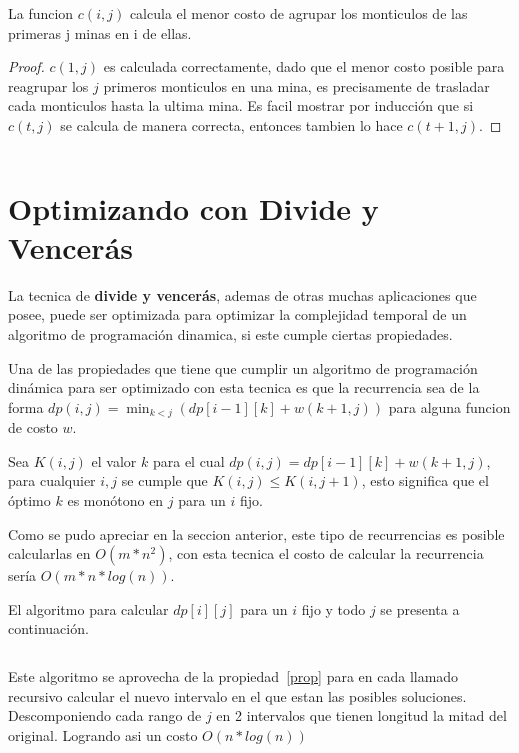 \documentclass[spanish]{llncs}
\begin{document}
\begin{theorem}
	La funcion $c(i,j)$ calcula el menor costo de agrupar los monticulos de
	las primeras j minas en i de ellas.
\end{theorem}

\begin{proof}
	$c(1,j)$ es calculada correctamente, dado que el menor costo posible para
	reagrupar los $j$ primeros monticulos en una mina, es precisamente de trasladar
	cada monticulos hasta la ultima mina. Es facil mostrar por inducción que si
	$c(t,j)$ se calcula de manera correcta, entonces tambien lo hace $c(t+1,j)$.
\end{proof}

\inputminted{python}{basic.py}

\section{Optimizando con Divide y Vencerás}

La tecnica de \textbf{divide y vencerás}, ademas de otras muchas aplicaciones
que posee, puede ser optimizada para optimizar la complejidad temporal de un
algoritmo de programación dinamica, si este cumple ciertas propiedades.

Una de las propiedades que tiene que cumplir un algoritmo de programación
dinámica para ser optimizado con esta tecnica es que la recurrencia sea de
la forma $dp(i,j) = \min_{k<j}(dp[i-1][k] + w(k+1,j))$ para alguna funcion
de costo $w$.

\begin{property}
	\label{prop}
	Sea $K(i,j)$ el valor $k$ para el cual $dp(i,j) = dp[i-1][k] + w(k+1,j)$,
	para cualquier $i,j$ se cumple que $K(i,j) \le K(i,j+1)$, esto significa que
	el óptimo $k$ es monótono en $j$ para un $i$ fijo.
\end{property}

Como se pudo apreciar en la seccion anterior, este tipo de recurrencias es posible
calcularlas en $O(m*n^2)$, con esta tecnica el costo de calcular la recurrencia
sería $O(m*n*log(n))$.

El algoritmo para calcular $dp[i][j]$ para un $i$ fijo y todo $j$ se presenta a
continuación.

\inputminted{python}{optimization.py}

Este algoritmo se aprovecha de la propiedad~\ref{prop} para en cada llamado
recursivo calcular el nuevo intervalo en el que estan las posibles soluciones.
Descomponiendo cada rango de $j$ en 2 intervalos que tienen longitud la mitad
del original. Logrando asi un costo $O(n*log(n))$
\end{document}
